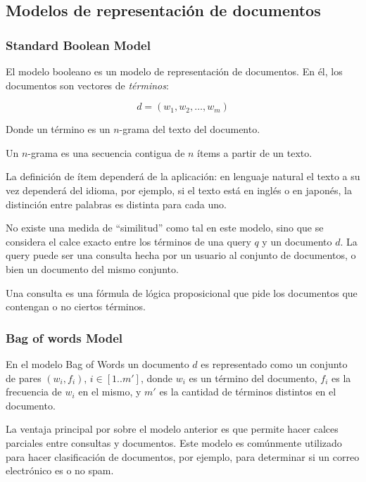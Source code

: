 \documentclass[upright, contnum]{umemoria}
\begin{document}
\subsection{Modelos de representación de documentos}
\label{sec-2.2.1}


    \subsubsection{Standard Boolean Model}

    El modelo booleano es un modelo de representación de
    documentos. En él, los documentos son vectores de \emph{términos}:

    $$d = (w_1,w_2,\ldots,w_m)$$

    Donde un término es un $n$-grama del texto del documento.

    \begin{defn} Un $n$-grama es una secuencia contigua de $n$ ítems a
    partir de un texto. \end{defn}

    La definición de ítem dependerá de la aplicación: en lenguaje
    natural el texto a su vez dependerá del idioma, por ejemplo, si el
    texto está en inglés o en japonés, la distinción entre palabras
    es distinta para cada uno. 

    No existe una medida de ``similitud'' como tal en este modelo, sino
    que se considera el calce exacto entre los términos de una query
    $q$ y un documento $d$. La query puede ser una consulta hecha por
    un usuario al conjunto de documentos, o bien un documento del
    mismo conjunto.

    Una consulta es una fórmula de lógica proposicional que pide los
    documentos que contengan o no ciertos términos.

    \subsubsection{Bag of words Model}

    En el modelo Bag of Words un documento $d$ es representado como un
    conjunto de pares $(w_i, f_i)$, $i\in[1..m']$, donde $w_i$ es un
    término del documento, $f_i$ es la frecuencia de $w_i$ en el
    mismo, y $m'$ es la cantidad de términos distintos en el
    documento. 

    La ventaja principal por sobre el modelo anterior es que permite
    hacer calces parciales entre consultas y documentos. Este modelo
    es comúnmente utilizado para hacer clasificación de documentos,
    por ejemplo, para determinar si un correo electrónico es o no
    spam.
\end{document}
